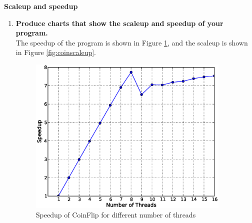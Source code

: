 \documentclass[letterpaper, 11pt]{article}
\begin{document}
\textbf{Scaleup and speedup}\\
\begin{enumerate}
    \item \textbf{Produce charts that show the scaleup and speedup of your program.}\\
       The speedup of the program is shown in Figure \ref{fig:coinspeedup}, and the scaleup is shown in Figure \ref{fig:coinscaleup}.

        \begin{figure}[htbp]
            \centering
            \includegraphics[width=3.8in]{coinspeedup.eps}
            \caption{Speedup of CoinFlip for different number of threads}
            \label{fig:coinspeedup}
        \end{figure}


\end{enumerate}
\end{document}
